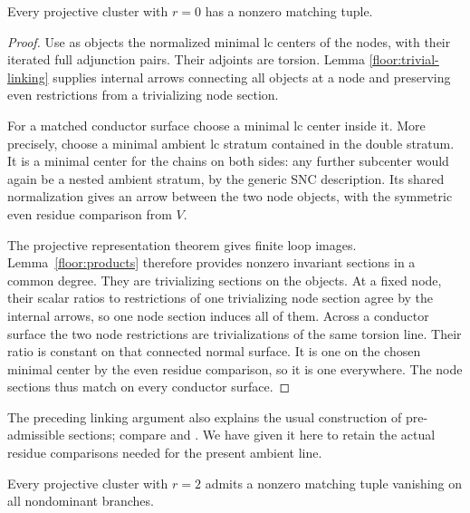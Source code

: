 \begin{lemma}[Matching in projective clusters with $r=0$]
\label{floor:projective-r0}
Every projective cluster with $r=0$ has a nonzero matching
tuple.
\end{lemma}

\begin{proof}
Use as objects the normalized minimal lc centers of the
nodes, with their iterated full adjunction pairs.
Their adjoints are torsion.  Lemma
\ref{floor:trivial-linking} supplies internal arrows
connecting all objects at a node and preserving even
restrictions from a trivializing node section.

For a matched conductor surface choose a minimal lc
center inside it.  More precisely, choose a minimal
ambient lc stratum contained in the double stratum.
It is a minimal center for the chains on both sides:
any further subcenter would again be a nested ambient
stratum, by the generic SNC description.  Its shared
normalization gives an arrow between the two node
objects, with the symmetric even residue comparison
from $V$.

The projective representation theorem gives finite
loop images.  Lemma~\ref{floor:products} therefore
provides nonzero invariant sections in a common
degree.  They are trivializing sections on the
objects.  At a fixed node, their scalar ratios to
restrictions of one trivializing node section agree
by the internal arrows, so one node section induces
all of them.  Across a conductor surface the two
node restrictions are trivializations of the same
torsion line.  Their ratio is constant on that
connected normal surface.  It is one on the chosen
minimal center by the even residue comparison, so
it is one everywhere.  The node sections thus match
on every conductor surface.
\end{proof}

The preceding linking argument also explains the
usual construction of pre-admissible sections; compare
\cite[Section~5]{GongyoNumericallyTrivial}
and \cite{KollarSources}.  We have given it here to retain
the actual residue comparisons needed for the present
ambient line.

\begin{lemma}[Matching in projective clusters with $r=2$]
\label{floor:projective-r2}
Every projective cluster with $r=2$ admits a nonzero
matching tuple vanishing on all nondominant branches.
\end{lemma}


